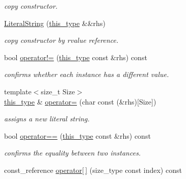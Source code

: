 \begin{DoxyCompactItemize}
\begin{DoxyCompactList}\small\item\em copy constructor. \end{DoxyCompactList}\item 
\hypertarget{classhryky_1_1_literal_string_a9ba45708b312153931f5b97481d1aff6}{\hyperlink{classhryky_1_1_literal_string_a9ba45708b312153931f5b97481d1aff6}{Literal\-String} (\hyperlink{classhryky_1_1_literal_string}{this\-\_\-type} \&\&rhs)}\label{classhryky_1_1_literal_string_a9ba45708b312153931f5b97481d1aff6}

\begin{DoxyCompactList}\small\item\em copy constructor by rvalue reference. \end{DoxyCompactList}\item 
\hypertarget{classhryky_1_1_literal_string_afe2fa01512ea05bd2885a03431ee4723}{bool \hyperlink{classhryky_1_1_literal_string_afe2fa01512ea05bd2885a03431ee4723}{operator!=} (\hyperlink{classhryky_1_1_literal_string}{this\-\_\-type} const \&rhs) const }\label{classhryky_1_1_literal_string_afe2fa01512ea05bd2885a03431ee4723}

\begin{DoxyCompactList}\small\item\em confirms whether each instance has a different value. \end{DoxyCompactList}\item 
\hypertarget{classhryky_1_1_literal_string_a7b2563fbbbf665c982e6b23b966a83a4}{{\footnotesize template$<$size\-\_\-t Size$>$ }\\\hyperlink{classhryky_1_1_literal_string}{this\-\_\-type} \& \hyperlink{classhryky_1_1_literal_string_a7b2563fbbbf665c982e6b23b966a83a4}{operator=} (char const (\&rhs)\mbox{[}Size\mbox{]})}\label{classhryky_1_1_literal_string_a7b2563fbbbf665c982e6b23b966a83a4}

\begin{DoxyCompactList}\small\item\em assigns a new literal string. \end{DoxyCompactList}\item 
\hypertarget{classhryky_1_1_literal_string_a04dc0235cd6c2c88809a7e275bfafdd2}{bool \hyperlink{classhryky_1_1_literal_string_a04dc0235cd6c2c88809a7e275bfafdd2}{operator==} (\hyperlink{classhryky_1_1_literal_string}{this\-\_\-type} const \&rhs) const }\label{classhryky_1_1_literal_string_a04dc0235cd6c2c88809a7e275bfafdd2}

\begin{DoxyCompactList}\small\item\em confirms the equality between two instances. \end{DoxyCompactList}\item 
\hypertarget{classhryky_1_1_literal_string_a92c0ce5bf2ddee25c0c38cc44c8d86de}{const\-\_\-reference \hyperlink{classhryky_1_1_literal_string_a92c0ce5bf2ddee25c0c38cc44c8d86de}{operator\mbox{[}$\,$\mbox{]}} (size\-\_\-type const index) const }\label{classhryky_1_1_literal_string_a92c0ce5bf2ddee25c0c38cc44c8d86de}


\end{DoxyCompactItemize}
